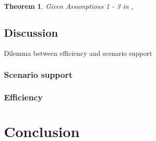 \documentclass[letterpaper, 10 pt, conference]{ieeeconf}
\newtheorem{thm}{Theorem}
\begin{document}
\begin{thm}
\label{thm:homotopy_no_pref:optimal}
Given Assumptions 1 - 3 in \cite{Karaman-RSS-10},

\end{thm}

\subsection{Discussion}

Dilemma between efficiency and scenario support

\subsubsection{Scenario support}

\subsubsection{Efficiency}

\section{Conclusion}
\label{sec:conclusion}



\end{document}

